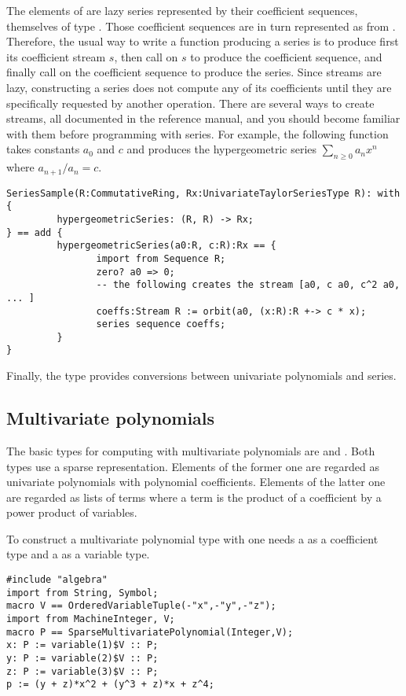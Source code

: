 The elements of  are lazy series
represented by their coefficient sequences, themselves of type
. Those coefficient sequences are in turn represented
as  from \libaldor. Therefore, the usual way to write a
function producing a series is to produce first its coefficient stream $s$,
then call  on $s$ to produce the
coefficient sequence, and finally call
 on the coefficient sequence
to produce the series. Since streams are lazy, constructing a series
does not compute any of its coefficients until they are
specifically requested by another operation. There are several ways
to create streams, all documented in the \libaldor{} reference manual,
and you should become familiar with them before programming with series.
For example, the following function takes constants
$a_0$ and $c$ and produces the hypergeometric series
$\sum_{n\ge 0} a_n x^n$ where $a_{n+1}/a_n = c$.
\begin{verbatim}
SeriesSample(R:CommutativeRing, Rx:UnivariateTaylorSeriesType R): with {
         hypergeometricSeries: (R, R) -> Rx;
} == add {
         hypergeometricSeries(a0:R, c:R):Rx == {
                import from Sequence R;
                zero? a0 => 0;
                -- the following creates the stream [a0, c a0, c^2 a0, ... ]
                coeffs:Stream R := orbit(a0, (x:R):R +-> c * x);
                series sequence coeffs;
         }
}
\end{verbatim}
Finally, the type  provides
conversions between univariate polynomials and series.

\subsection{Multivariate polynomials}
The basic types for computing with multivariate polynomials
are  and
.
Both types use a sparse representation.
Elements of the former one are regarded as univariate polynomials
with polynomial coefficients.
Elements of the latter one are regarded as lists of terms
where a term is the product of a coefficient by a power product
of variables.

To construct a multivariate polynomial type with 
one needs a  as  a coefficient type 
and a  as a variable type.
\begin{verbatim}
#include "algebra"
import from String, Symbol;
macro V == OrderedVariableTuple(-"x",-"y",-"z");
import from MachineInteger, V;
macro P == SparseMultivariatePolynomial(Integer,V);
x: P := variable(1)$V :: P;
y: P := variable(2)$V :: P;
z: P := variable(3)$V :: P;
p := (y + z)*x^2 + (y^3 + z)*x + z^4;
\end{verbatim}

